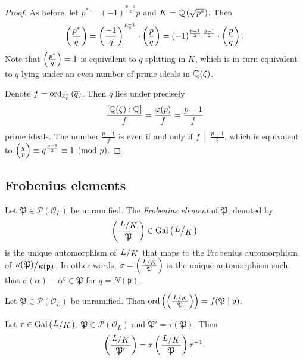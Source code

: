 \begin{proof}
As before, let $p^* = (-1)^{\frac{p-1}{2}} p$ and
$K = \mathbb{Q} \left(\sqrt{p^*}\right)$. Then
\[
\left(\frac{p^*}{q}\right) =
\left(\frac{-1}{q}\right)^{\frac{p-1}{2}} \cdot \left(\frac{p}{q}\right) =
(-1)^{\frac{p-1}{2} \cdot \frac{q-1}{2}} \cdot \left(\frac{p}{q}\right).
\]
Note that $\left(\frac{p^*}{q}\right) = 1$ is equivalent to $q$ splitting
in $K$, which is in turn equivalent to $q$ lying under an even
number of prime ideals in $\mathbb{Q}(\zeta)$.

Denote $f = \operatorname{ord}_{\mathbb{Z}_p^*} \left(\overline{q}\right)$. Then $q$ lies under
precisely
\[
\frac{[\mathbb{Q}(\zeta) : \mathbb{Q}]}{f} =
\frac{\varphi(p)}{f} =
\frac{p-1}{f}
\]
prime ideals. The number $\frac{p-1}{f}$ is even if and only if
$\left.f~\middle\vert~\frac{p-1}{2}\right.$, which is equivalent to
$\left(\frac{q}{p}\right) \equiv q^{\frac{p-1}{2}} \equiv 1 \pmod{p}$.
\end{proof}

\newpage

\subsection{Frobenius elements}

\begin{definicija}
Let $\mathfrak{P} \in \mathcal{P}(\mathcal{O}_L)$ be unramified.
The \emph{Frobenius element} of
$\mathfrak{P}$, denoted by
\[
\br{\frac{\kvoc{L}{K}}{\mathfrak{P}}} \in \Gal \br{\kvoc{L}{K}}
\]
is the unique automorphism of $\kvoc{L}{K}$ that maps to the
Frobenius automorphism of
$\kvoc{\kappa(\mathfrak{P})}{\kappa(\mathfrak{p})}$. In other
words, $\sigma = \br{\frac{\kvoc{L}{K}}{\mathfrak{P}}}$ is the
unique automorphism such that
$\sigma(\alpha) - \alpha^q \in \mathfrak{P}$ for
$q = N(\mathfrak{p})$.
\end{definicija}

\begin{lema}
Let $\mathfrak{P} \in \mathcal{P}(\mathcal{O}_L)$ be unramified.
Then
$\ord \br{\br{\frac{\kvoc{L}{K}}{\mathfrak{P}}}} =
f(\mathfrak{P} \mid \mathfrak{p})$.
\end{lema}

\obvs

\begin{lema}
Let $\tau \in \Gal \br{\kvoc{L}{K}}$,
$\mathfrak{P} \in \mathcal{P}(\mathcal{O}_L)$ and
$\mathfrak{P}' = \tau(\mathfrak{P})$. Then
\[
\br{\frac{\kvoc{L}{K}}{\mathfrak{P}'}} =
\tau \br{\frac{\kvoc{L}{K}}{\mathfrak{P}}} \tau^{-1}.
\]
\end{lema}

